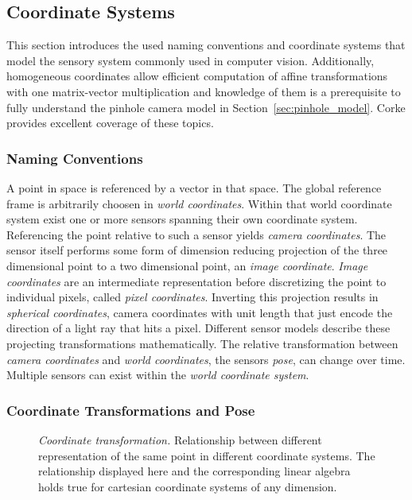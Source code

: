 \subsection{Coordinate Systems}

This section introduces the used naming conventions and coordinate systems that model the sensory system commonly used in computer vision.
Additionally, homogeneous coordinates allow efficient computation of affine transformations with one matrix-vector multiplication and knowledge of them is a prerequisite to fully understand the pinhole camera model in Section~\ref{sec:pinhole_model}.
Corke\cite[p. 15-39,533]{corke_2011} provides excellent coverage of these topics.

\subsubsection*{Naming Conventions}

A point in space is referenced by a vector in that space.
The global reference frame is arbitrarily choosen in \emph{world coordinates}.
Within that world coordinate system exist one or more sensors spanning their own coordinate system.
Referencing the point relative to such a sensor yields \emph{camera coordinates}.
The sensor itself performs some form of dimension reducing projection of the three dimensional point to a two dimensional point, an \emph{image coordinate}\cite[p. 251-261]{corke_2011}.
\emph{Image coordinates} are an intermediate representation before discretizing the point to individual pixels, called \emph{pixel coordinates}.
Inverting this projection results in \emph{spherical coordinates}, camera coordinates with unit length that just encode the direction of a light ray that hits a pixel.
Different sensor models describe these projecting transformations mathematically.
The relative transformation between \emph{camera coordinates} and \emph{world coordinates}, the sensors \emph{pose}, can change over time.
Multiple sensors can exist within the \emph{world coordinate system}.

\subsubsection*{Coordinate Transformations and Pose}

\begin{figure}[H]
    \scalebox{0.7}{%
    
    }
    \caption[Coordinate transformation]{\emph{Coordinate transformation.} Relationship between different representation of the same point in different coordinate systems. The relationship displayed here and the corresponding linear algebra holds true for cartesian coordinate systems of any dimension.}\label{fig:coordinate_transformation}
\end{figure}

